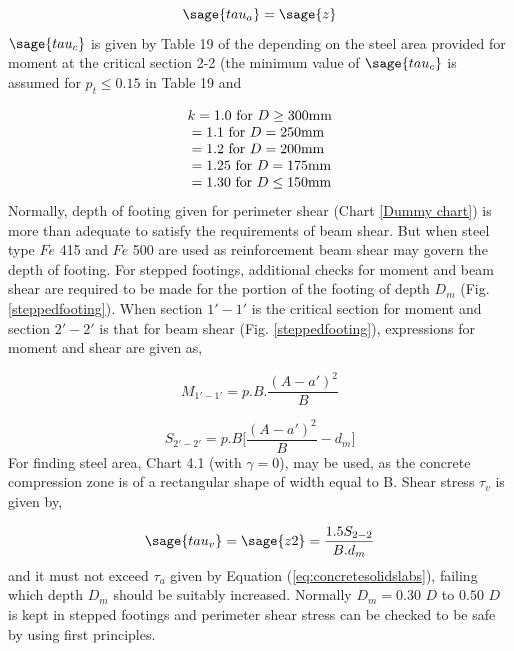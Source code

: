 \documentclass{report}
\newcommand{\figmacro}[1] {Fig. #1}
\newcommand{\equmacro}[1] {Equation #1}
\newcommand{\chartmacro}[1] {Chart #1}
\newcommand{\tablemacro}[1] {Table #1}
\newcommand{\Fefouronefivemacro}[1] {$Fe$ 415 #1}
\newcommand{\Fefivezerozeromacro}[1] {$Fe$ 500 #1}
\begin{document}
\begin{equation}
         \label{eq:concretesolidslabs}
        \sage{tau_a}=\sage{z}
\end{equation}
$\sage{tau_c}$ is given by \tablemacro 19 of the   depending on the steel area provided for moment at the critical section 2-2 (the minimum value of $\sage{tau_c}$ is assumed for $p_t $$\leq$$ 0.15$ in \tablemacro 19 and

$$\begin{array}{l@{}l}
&{}k=1.0 \text{ for } D \geq 300 \text{mm}\\
&{}=1.1 \text{ for } D = 250 \text{mm}\\   
&{}=1.2 \text{ for } D = 200 \text{mm}\\
&{}=1.25 \text{ for } D = 175 \text{mm}\\   
&{}=1.30 \text{ for } D \leq 150 \text{mm}  
\end{array}$$
Normally, depth of footing given for perimeter shear (\chartmacro \ref{Dummy chart}) is more than adequate
to satisfy the requirements of beam shear. But when steel type  \Fefouronefivemacro and \Fefivezerozeromacro are used as reinforcement beam shear may govern the depth of footing. For stepped footings, additional checks for moment and beam shear are required to be made for the portion of the footing of depth $D_m$ (\figmacro \ref{steppedfooting}). When section ${1'-1'}$ is the critical section for moment and section ${2'-2'}$ is that for beam shear (\figmacro \ref{steppedfooting}), expressions for moment and shear are given as,

\begin{equation}
         \label{eq:momentandshear1-1}
        M_{1'-1'}=p.B.\frac{(A-a')^2}{B}
\end{equation}

\begin{equation}                                             \label{eq:momentandshear2-2}
        S_{2'-2'}=p.B\bigg[\frac{(A-a')^2}{B}-d_m\bigg]                                 
\end{equation}
For finding steel area, \chartmacro 4.1 (with $\gamma = 0$), may be used, as the concrete compression zone is of a rectangular shape of width equal to B. Shear stress $\tau_v$ is given by,

\begin{equation}
        \label{eq:Shearstress}
        \sage{tau_v}=\sage{z2}=\frac{1.5S_{2-2}}{B.d_m}
\end{equation}
and it must not exceed $\tau_a$ given by \equmacro (\ref{eq:concretesolidslabs}), failing which depth $D_m$ should be suitably increased.
Normally $D_m = 0.30$ $D$ to $0.50$ $D$ is kept in stepped footings and perimeter shear stress can be checked to be safe by using first principles.
\end{document}
